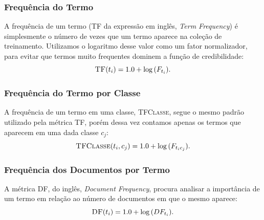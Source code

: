 \subsubsection{Frequência do Termo} %
\label{subsubsection::sumtf}

A frequência de um termo (\textsc{TF} da expressão em inglês, \textit{Term Frequency}) é simplesmente o número de vezes que um termo aparece na coleção de treinamento. Utilizamos o logaritmo desse valor como um fator normalizador, para evitar que termos muito frequentes dominem a função de credibilidade:
\begin{equation}\label{eqn::sumtf}
   \textsc{TF}(t_i) = 1.0 + \log{ ( F_{t_i} ) }.
\end{equation}


\subsubsection{Frequência do Termo por Classe} %
\label{subsubsection::tf}

A frequência de um termo em uma classe, \textsc{TFClasse}, segue o mesmo padrão utilizado pela métrica \textsc{TF}, porém dessa vez contamos apenas os termos que aparecem em uma dada classe $c_j$:
\begin{equation}\label{eqn::tf}
  \textsc{TFClasse}(t_i, c_j) = 1.0 + \log{ ( F_{t_ic_j} ) }.
\end{equation}


\subsubsection{Frequência dos Documentos por Termo}%
\label{subsubsection::df}

A métrica \textsc{DF}, do inglês, \textit{Document Frequency}, procura analisar a importância de um termo em relação ao número de documentos em que o mesmo aparece:
\begin{equation}\label{eqn::df}
  \textsc{DF}(t_i) = 1.0 + \log{ ( DF_{t_i} ) }.
\end{equation}



